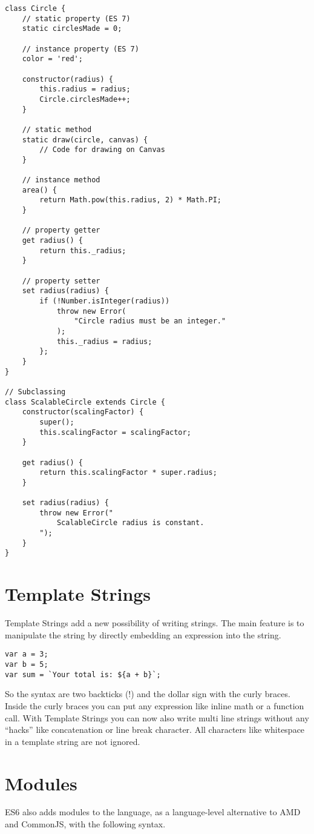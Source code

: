 \documentclass{bioinfo}
\begin{document}
\begin{lstlisting}
class Circle {
    // static property (ES 7)
    static circlesMade = 0;

    // instance property (ES 7)
    color = 'red';

    constructor(radius) {
        this.radius = radius;
        Circle.circlesMade++;
    }

    // static method
    static draw(circle, canvas) {
        // Code for drawing on Canvas
    }

    // instance method
    area() {
        return Math.pow(this.radius, 2) * Math.PI;
    }

    // property getter
    get radius() {
        return this._radius;
    }

    // property setter
    set radius(radius) {
        if (!Number.isInteger(radius))
            throw new Error(
                "Circle radius must be an integer."
            );
            this._radius = radius;
        };
    }
}

// Subclassing
class ScalableCircle extends Circle {
    constructor(scalingFactor) {
        super();
        this.scalingFactor = scalingFactor;
    }

    get radius() {
        return this.scalingFactor * super.radius;
    }

    set radius(radius) {
        throw new Error("
            ScalableCircle radius is constant.
        ");
    }
}
\end{lstlisting}

\section{Template Strings}
Template Strings add a new possibility of writing strings.
The main feature is to manipulate the string by
directly embedding an expression into the string.

\begin{lstlisting}
var a = 3;
var b = 5;
var sum = `Your total is: ${a + b}`;
\end{lstlisting}
So the syntax are two backticks (!) and the dollar sign with the curly braces.
Inside the curly braces you can put any expression like inline math or a function call.
With Template Strings you can now also write multi line strings without any ``hacks'' like
concatenation or line break character. All characters like whitespace in a template string
are not ignored.

\section{Modules}
ES6 also adds modules to the language, as a language-level alternative to AMD and
CommonJS, with the following syntax.
\end{document}
